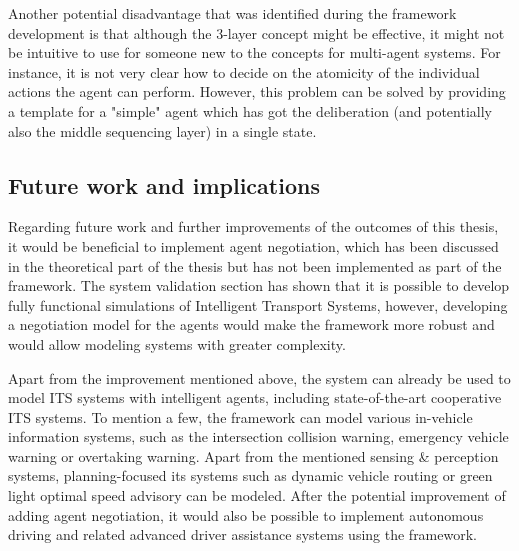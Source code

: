\documentclass[0main.tex]{subfiles}
\begin{document}
Another potential disadvantage that was identified during the framework development is that
although the 3-layer concept might be effective, it might not be intuitive to use for someone
new to the concepts for multi-agent systems. For instance, it is not very clear how to decide
on the atomicity of the individual actions the agent can perform. However, this problem can be
solved by providing a template for a "simple" agent which has got the deliberation (and
potentially also the middle sequencing layer) in a single state. 

\subsection{Future work and implications}

Regarding future work and further improvements of the outcomes of this thesis, it would be
beneficial to implement agent negotiation, which has been discussed in the theoretical part of
the thesis but has not been implemented as part of the framework. The system validation section
has shown that it is possible to develop fully functional simulations of Intelligent Transport
Systems, however, developing a negotiation model for the agents would make the framework more
robust and would allow modeling systems with greater complexity.

Apart from the improvement mentioned above, the system can already be used to model ITS systems
with intelligent agents, including state-of-the-art cooperative ITS systems. To mention a few,
the framework can model various in-vehicle information systems, such as the intersection
collision warning, emergency vehicle warning or overtaking warning. Apart from the mentioned
sensing \& perception systems, planning-focused its systems such as dynamic vehicle routing or
green light optimal speed advisory can be modeled. After the potential improvement of adding
agent negotiation, it would also be possible to implement autonomous driving and related
advanced driver assistance systems using the framework.
\end{document}
